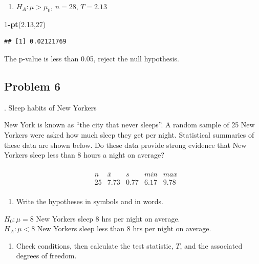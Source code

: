 \documentclass[
]{book}
\newenvironment{Shaded}{\begin{snugshade}}{\end{snugshade}}
\newcommand{\DecValTok}[1]{\textcolor[rgb]{0.00,0.00,0.81}{#1}}
\newcommand{\FloatTok}[1]{\textcolor[rgb]{0.00,0.00,0.81}{#1}}
\newcommand{\KeywordTok}[1]{\textcolor[rgb]{0.13,0.29,0.53}{\textbf{#1}}}
\newcommand{\NormalTok}[1]{#1}
\newcommand{\OperatorTok}[1]{\textcolor[rgb]{0.81,0.36,0.00}{\textbf{#1}}}
\providecommand{\tightlist}{%
  \setlength{\itemsep}{0pt}\setlength{\parskip}{0pt}}
\begin{document}
\begin{enumerate}
\def\labelenumi{\alph{enumi}.}
\setcounter{enumi}{3}
\tightlist
\item
  \(H_{A}: \mu > \mu_{0}\), \(n = 28\), \(T = 2.13\)
\end{enumerate}

\begin{Shaded}
\begin{Highlighting}[]
\DecValTok{1}\OperatorTok{-}\KeywordTok{pt}\NormalTok{(}\FloatTok{2.13}\NormalTok{,}\DecValTok{27}\NormalTok{)}
\end{Highlighting}
\end{Shaded}

\begin{verbatim}
## [1] 0.02121769
\end{verbatim}

The p-value is less than 0.05, reject the null hypothesis.

\hypertarget{problem-6-4}{%
\subsection{Problem 6}\label{problem-6-4}}

. Sleep habits of New Yorkers

New York is known as ``the city that never sleeps''. A random sample of 25 New Yorkers were asked how much sleep they get per night. Statistical summaries of these data are shown below. Do these data provide strong evidence that New Yorkers sleep less than 8 hours a night on average?

\[
\begin{array}{cccccc} & & & &  &
\\& n & \bar{x} & s     & min   & max \\
&\hline 25  & 7.73      & 0.77  & 6.17  & 9.78 \\ 
&   &               &       &           & 
\end{array} 
\]

\begin{enumerate}
\def\labelenumi{\alph{enumi}.}
\tightlist
\item
  Write the hypotheses in symbols and in words.
\end{enumerate}

\(H_0: \mu = 8\) New Yorkers sleep 8 hrs per night on average.\\
\(H_A: \mu < 8\) New Yorkers sleep less than 8 hrs per night on average.

\begin{enumerate}
\def\labelenumi{\alph{enumi}.}
\setcounter{enumi}{1}
\tightlist
\item
  Check conditions, then calculate the test statistic, \(T\), and the associated degrees of freedom.
\end{enumerate}
\end{document}
